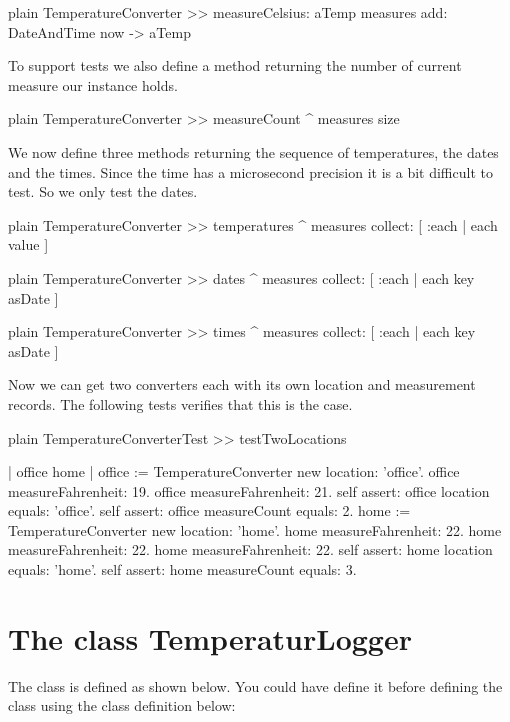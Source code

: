 \documentclass[10pt,twoside,english]{_support/latex/sbabook/sbabook}
\begin{document}
\begin{displaycode}{plain}
TemperatureConverter >> measureCelsius: aTemp
    measures add: DateAndTime now -> aTemp
\end{displaycode}

To support tests we also define a method returning the number of current measure our instance holds.

\begin{displaycode}{plain}
TemperatureConverter >> measureCount
    ^ measures size
\end{displaycode}

We now define three methods returning the sequence of temperatures, the dates and the times.
Since the time has a microsecond precision it is a bit difficult to test. So we only test the dates.

\begin{displaycode}{plain}
TemperatureConverter >> temperatures
    ^ measures collect: [ :each | each value ]
\end{displaycode}

\begin{displaycode}{plain}
TemperatureConverter >> dates
    ^ measures collect: [ :each | each key asDate ]
\end{displaycode}

\begin{displaycode}{plain}
TemperatureConverter >> times
    ^ measures collect: [ :each | each key asDate ]
\end{displaycode}

Now we can get two converters each with its own location and measurement records.
The following tests verifies that this is the case.

\begin{displaycode}{plain}
TemperatureConverterTest >> testTwoLocations

    | office home |
    office := TemperatureConverter new location: 'office'.
    office measureFahrenheit: 19.
    office measureFahrenheit: 21.
    self assert: office location equals: 'office'.
    self assert: office measureCount equals: 2.
    home := TemperatureConverter new location: 'home'.
    home measureFahrenheit: 22.
    home measureFahrenheit: 22.
    home measureFahrenheit: 22.
    self assert: home location equals: 'home'.
    self assert: home measureCount equals: 3.
\end{displaycode}
\section{The class TemperaturLogger}
The class  is defined as shown below. You could have define it before defining the class   using the class definition below:
\end{document}
